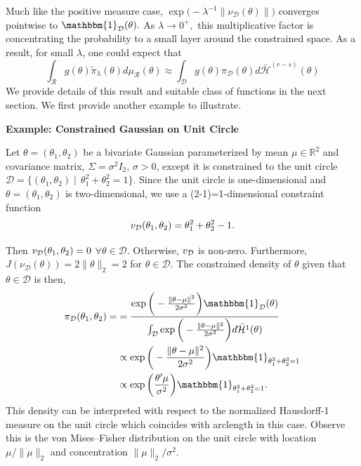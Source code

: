 \documentclass[10pt,fleqn]{article} \pdfoutput=1
\DeclareMathOperator{\1}{\mathbbm{1}} \DeclareMathOperator{\bigO}{\mc O}
\begin{document}
Much like the positive measure case,
$\exp\bigg(-{\lambda^{-1}}\|\nu_\mathcal{D}(\theta)\|\bigg)$ converges
pointwise to $\mathbbm{1}_\mathcal{D}(\theta).$ As $\lambda\to0^+,$ this
multiplicative factor is concentrating the probability to a small layer
around the constrained space. As a result, for small $\lambda$, one could
 expect that
$$ \int_\mathcal{R} g(\theta)
\tilde{\pi}_\lambda(\theta) d\mu_\mathcal{R}(\theta)
	\approx
	\int_\mathcal{D} g(\theta) \pi_\mathcal{D}(\theta)
	d\bar{\mathcal{H}}^{(r-s)}(\theta) $$
We provide details of this result and suitable class of
functions in the next section. We first provide another example to illustrate.

\textbf{Example: Constrained Gaussian on Unit Circle} 

Let $\theta = (\theta_1,\theta_2)$ be a bivariate Gaussian
parameterized by mean
$\mu \in\mathbb{R}^2$ and covariance matrix, $\Sigma = \sigma^2 I_2$,
$\sigma > 0$, except it is constrained to the unit circle $\mathcal{D} =
	\{(\theta_1,\theta_2) \mid \, \theta_1^2+\theta_2^2 = 1\}.$  Since the unit
circle is one-dimensional and $\theta = (\theta_1,\theta_2)$ is
two-dimensional, we use a (2-1)=1-dimensional constraint function
$$v_{\mathcal{D}}(\theta_1,\theta_2) = \theta_1^2+\theta_2^2 -1.$$

Then
$v_{\mathcal{D}}(\theta_1,\theta_2) = 0$ $\forall \theta\in\mathcal{D}$. Otherwise,
$v_{\mathcal{D}}$ is non-zero.  Furthermore, $J(\nu_\mathcal{D}(\theta)) =
	2\|\theta\|_2 = 2$ for $\theta\in\mathcal{D}.$ The constrained
density of $\theta$ given that $\theta\in \mathcal{D}$ is then,
\begin{align*} \pi_\mathcal{D}(\theta_1,\theta_2)=
	 & =
	\frac{\exp\bigg(-\frac{\|\theta-\mu\|^2}{2\sigma^2}\bigg)\mathbbm{1}_\mathcal{D}(\theta)}{\int_\mathcal{D}
		\exp\bigg(-\frac{\|\theta-\mu\|^2}{2\sigma^2}\bigg)d\bar{\mathcal{H}}^{1}(\theta)
	}                                               \\ &\propto \exp\bigg(-\frac{\|\theta-\mu\|^2}{2\sigma^2}\bigg)
	\mathbbm{1}_{\theta_1^2 + \theta_2^2 = 1} 
	\\ &\propto \exp\bigg( \frac{\theta'\mu}{\sigma^2}\bigg)
	\mathbbm{1}_{\theta_1^2 + \theta_2^2 = 1}
.\end{align*} 
This density
can be interpreted with respect to the normalized Hausdorff-1 measure on
the unit circle which coincides with arclength in this case. Observe this is the von Mises--Fisher distribution on the unit circle
with location $\mu /\|\mu\|_2$ and concentration $\|\mu\|_2/\sigma^2$.
\end{document}
